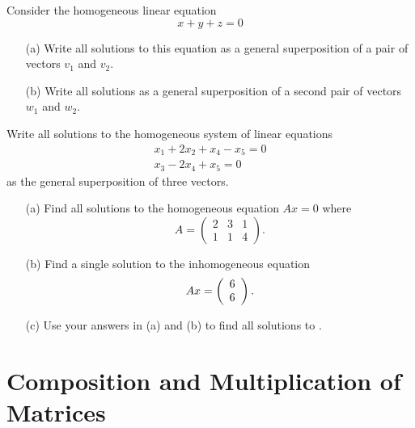 \EXER

\TEXER

\begin{exercise} \label{c4.4.1}
Consider the homogeneous linear equation
\[
x+y+z = 0
\]
\begin{enumerate}
\item[(a)]  Write all solutions to this equation as a general
superposition of a pair of vectors $v_1$ and $v_2$.
\item[(b)]  Write all solutions as a general superposition of
a second pair of vectors $w_1$ and $w_2$.
\end{enumerate}
\end{exercise}

\begin{exercise} \label{c4.4.2}
Write all solutions to the homogeneous system of linear
equations
\begin{eqnarray*}
x_1+2x_2+x_4-x_5 = 0\\
x_3-2x_4+x_5 = 0
\end{eqnarray*}
as the general superposition of three vectors.
\end{exercise}

\begin{exercise} \label{c4.4.3}
\begin{itemize}
\item[(a)] Find all solutions to the homogeneous equation
$Ax=0$ where
\[
A = \left(\begin{array}{ccc} 2 & 3 & 1 \\ 1 & 1 & 4 \end{array}
\right).
\]
\item[(b)] Find a single solution to the inhomogeneous equation
\begin{equation}  \label{E:inhom}
Ax =\left(\begin{array}{r} 6 \\ 6\end{array}\right).
\end{equation}
\item[(c)] Use your answers in (a) and (b) to find all solutions
to .
\end{itemize}
\end{exercise}







\section{Composition and Multiplication of Matrices} \label{S:4.6}
 

